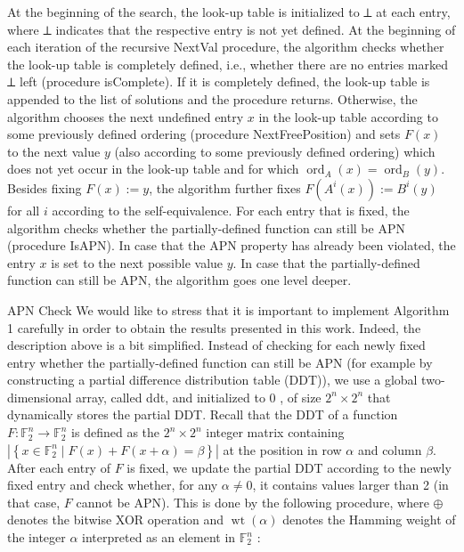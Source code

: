 \documentclass[10pt]{article}
\begin{document}
At the beginning of the search, the look-up table is initialized to ⟂ at each entry, where ⟂ indicates that the respective entry is not yet defined. At the beginning of each iteration of the recursive NextVal procedure, the algorithm checks whether the look-up table is completely defined, i.e., whether there are no entries marked ⟂ left (procedure isComplete). If it is completely defined, the look-up table is appended to the list of solutions and the procedure returns. Otherwise, the algorithm chooses the next undefined entry $x$ in the look-up table according to some previously defined ordering (procedure NextFreePosition) and sets $F(x)$ to the next value $y$ (also according to some previously defined ordering) which does not yet occur in the look-up table and for which $\operatorname{ord}_{A}(x)=\operatorname{ord}_{B}(y)$. Besides fixing $F(x):=y$, the algorithm further fixes $F\left(A^{i}(x)\right):=B^{i}(y)$ for all $i$ according to the self-equivalence. For each entry that is fixed, the algorithm checks whether the partially-defined function can still be APN (procedure IsAPN). In case that the APN property has already been violated, the entry $x$ is set to the next possible value $y$. In case that the partially-defined function can still be APN, the algorithm goes one level deeper.

APN Check We would like to stress that it is important to implement Algorithm 1 carefully in order to obtain the results presented in this work. Indeed, the description above is a bit simplified. Instead of checking for each newly fixed entry whether the partially-defined function can still be APN (for example by constructing a partial difference distribution table (DDT)), we use a global two-dimensional array, called ddt, and initialized to 0 , of size $2^{n} \times 2^{n}$ that dynamically stores the partial DDT. Recall that the DDT of a function $F: \mathbb{F}_{2}^{n} \rightarrow \mathbb{F}_{2}^{n}$ is defined as the $2^{n} \times 2^{n}$ integer matrix containing $\left|\left\{x \in \mathbb{F}_{2}^{n} \mid F(x)+F(x+\alpha)=\beta\right\}\right|$ at the position in row $\alpha$ and column $\beta$. After each entry of $F$ is fixed, we update the partial DDT according to the newly fixed entry and check whether, for any $\alpha \neq 0$, it contains values larger than 2 (in that case, $F$ cannot be APN). This is done by the following procedure, where $\oplus$ denotes the bitwise XOR operation and $\operatorname{wt}(\alpha)$ denotes the Hamming weight of the integer $\alpha$ interpreted as an element in $\mathbb{F}_{2}^{n}$ :
\end{document}
